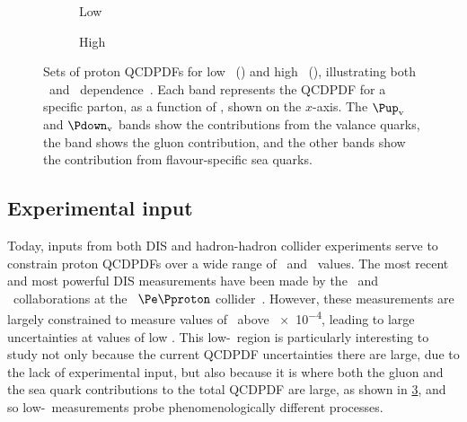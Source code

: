 
\begin{figure}
  \begin{subfigure}[b]{0.5\textwidth}
    \centering
    
    \caption{Low \pdfqsquared}
    \label{fig:prod:theory:pdf_sets:low_qsquared}
  \end{subfigure}
  \begin{subfigure}[b]{0.5\textwidth}
    \centering
    
    \caption{High \pdfqsquared}
    \label{fig:prod:theory:pdf_sets:high_qsquared}
  \end{subfigure}
  \caption{%
    Sets of proton \aclp{QCDPDF} for low \pdfqsquared\ 
    () and high \pdfqsquared\ 
    (), illustrating both 
    \bjorkenx\ and \pdfqsquared\ dependence~\cite{PDG2014}.
    Each band represents the \ac{QCDPDF} for a specific parton, as a function 
    of \bjorkenx, shown on the $x$-axis.
    The $\Pup_{\text{v}}$ and $\Pdown_{\text{v}}$ bands show the contributions 
    from the valance quarks, the \Pgluon band shows the gluon contribution, and 
    the other bands show the contribution from flavour-specific sea quarks.
  }
  \label{fig:prod:theory:pdf_sets}
\end{figure}

\subsection{Experimental input}
\label{chap:prod:theory:pdfs:inputs}

Today, inputs from both \ac{DIS} and hadron-hadron collider experiments serve 
to constrain proton \acp{QCDPDF} over a wide range of \bjorkenx\ and 
\pdfqsquared\ values.
The most recent and most powerful \ac{DIS} measurements have been made by the 
\hone\ and \zeus\ collaborations at the \hera\ $\Pe\Pproton$ 
collider~\cite{Abramowicz:1900rp}.
However, these measurements are largely constrained to measure values of 
\bjorkenx\ above \num{e-4}, leading to large uncertainties at values of low 
\bjorkenx.
This low-\bjorkenx\ region is particularly interesting to study not only 
because the current \ac{QCDPDF} uncertainties there are large, due to the lack 
of experimental input, but also because it is where both the gluon and the sea 
quark contributions to the total \ac{QCDPDF} are large, as shown in 
\cref{fig:prod:theory:pdf_sets}, and so low-\bjorkenx\ measurements probe 
phenomenologically different processes.

